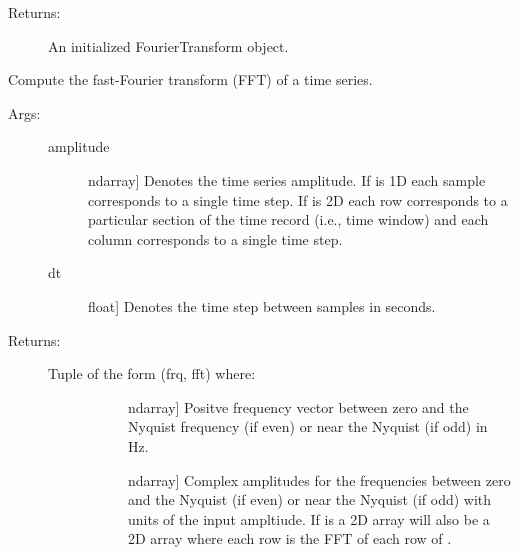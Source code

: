 \documentclass[letterpaper,10pt,english,openany,oneside]{sphinxmanual}
\begin{document}
\begin{fulllineitems}
\begin{fulllineitems}
\begin{description}
\begin{description}
\end{description}

\item[{Returns:}] \leavevmode
An initialized FourierTransform object.

\end{description}

\end{fulllineitems}


\begin{fulllineitems}
\label{\detokenize{index:sigpropy.FourierTransform.fft}}
Compute the fast-Fourier transform (FFT) of a time series.
\begin{description}
\item[{Args:}] \leavevmode\begin{description}
\item[{amplitude}] \leavevmode{[}ndarray{]}
Denotes the time series amplitude. If  is 1D
each sample corresponds to a single time step. If
 is 2D each row corresponds to a particular
section of the time record (i.e., time window) and each
column corresponds to a single time step.

\item[{dt}] \leavevmode{[}float{]}
Denotes the time step between samples in seconds.

\end{description}

\item[{Returns:}] \leavevmode\begin{description}
\item[{Tuple of the form (frq, fft) where:}] \leavevmode\begin{description}
\item[{}] \leavevmode{[}ndarray{]}
Positve frequency vector between zero and the
Nyquist frequency (if even) or near the Nyquist
(if odd) in Hz.

\item[{}] \leavevmode{[}ndarray{]}
Complex amplitudes for the frequencies between zero
and the Nyquist (if even) or near the Nyquist 
(if odd) with units of the input ampltiude.
If  is a 2D array  will also be a 2D
array where each row is the FFT of each row of 
.


\end{description}
\end{description}
\end{description}
\end{fulllineitems}
\end{fulllineitems}
\end{document}

